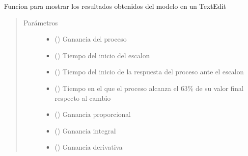 \documentclass[letterpaper,10pt,spanish]{sphinxmanual}
\begin{document}
\begin{fulllineitems}
\label{\detokenize{codigos/rutinas_CSV:rutinas_CSV.actualizar_Datos}}
Funcion para mostrar los resultados obtenidos del modelo en un TextEdit
\begin{quote}\begin{description}
\item[{Parámetros}] \leavevmode\begin{itemize}
\item {} 
 () \textendash{} Ganancia del proceso

\item {} 
 () \textendash{} Tiempo del inicio del escalon

\item {} 
 () \textendash{} Tiempo del inicio de la respuesta del proceso ante el escalon

\item {} 
 () \textendash{} Tiempo en el que el proceso alcanza el 63\% de su valor final respecto al cambio

\item {} 
 () \textendash{} Ganancia proporcional

\item {} 
 () \textendash{} Ganancia integral

\item {} 
 () \textendash{} Ganancia derivativa

\end{itemize}

\end{description}\end{quote}

\end{fulllineitems}
\end{document}
